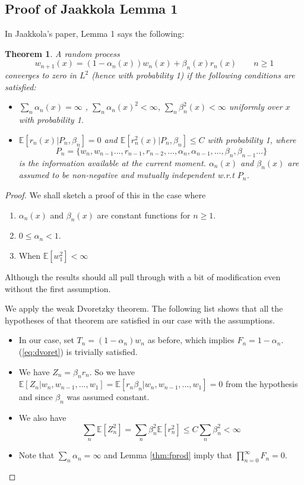 \documentclass{article}
\def\E{\mathbb{E}}
\newtheorem{theorem}{Theorem}
\begin{document}
\subsection{Proof of Jaakkola Lemma 1}
In Jaakkola's paper, Lemma 1 says the following:
\begin{theorem}
A random process 
\[ 
w_{n+1}(x) = (1 - \alpha_n(x))w_{n}(x) + \beta_n(x)r_n(x) \qquad n \ge 1
\]
converges to zero in $L^2$ (hence with probability 1) if the following conditions are satisfied:
\begin{itemize}
    \item $\sum_{n} \alpha_n(x) = \infty$ , $\sum_n \alpha_n(x)^2 < \infty$, $\sum_n \beta_n^2(x) < \infty$ uniformly over $x$ with probability 1. 
    \item $\E\left[ r_n(x) | P_n , \beta_n\right] = 0$ and $\E\left[ r_n^2(x) | P_n, \beta_n \right] \le C$ with probability 1, where
    \[ P_n = \{w_n,w_{n-1}\dots,r_{n-1},r_{n-2},\dots,\alpha_n,\alpha_{n-1},\dots,\beta_n,\beta_{n-1}\dots \}\]
    is the information available at the current moment. $\alpha_n(x)$ and $\beta_n(x)$ are assumed to be non-negative and mutually independent w.r.t $P_n$.
\end{itemize}
\end{theorem}
\begin{proof}
We shall sketch a proof of this in the case where 
\begin{enumerate}
    \item $\alpha_n(x)$ and $\beta_n(x)$ are constant functions for $n \ge 1$.
    \item  $0 \le \alpha_n < 1$.
    \item When $\E\left[ w_1^2 \right] < \infty$
\end{enumerate}
Although the results should all pull through with a bit of modification even without the first assumption. 

We apply the weak Dvoretzky theorem. The following list shows that all the hypotheses of that theorem are satisfied in our case with the assumptions.  
\begin{itemize}
    \item In our case, set $T_n = (1 - \alpha_n)w_n$ as before, which implies $F_n = 1 - \alpha_n$. (\ref{eq:dvoret}) is trivially satisfied. 
    \item We have $Z_n = \beta_n r_n$. So we have $\E\left[Z_n | w_n,w_{n-1},\dots,w_1\right]= \E\left[r_n  \beta_n| w_n,w_{n-1},\dots,w_1\right] = 0$ from the hypothesis and since $\beta_n$ was assumed constant.
    \item We also have \[ \sum_n\E[Z_n^2] = \sum_n \beta_n^2 \E[r_n^2] \le C \sum_n \beta_n^2 < \infty \]
    \item Note that $\sum_n \alpha_n = \infty$ and Lemma \ref{thm:fprod} imply that $\prod_{n=0}^{\infty} F_n = 0$. 
    
\end{itemize}


\end{proof}
\end{document}

